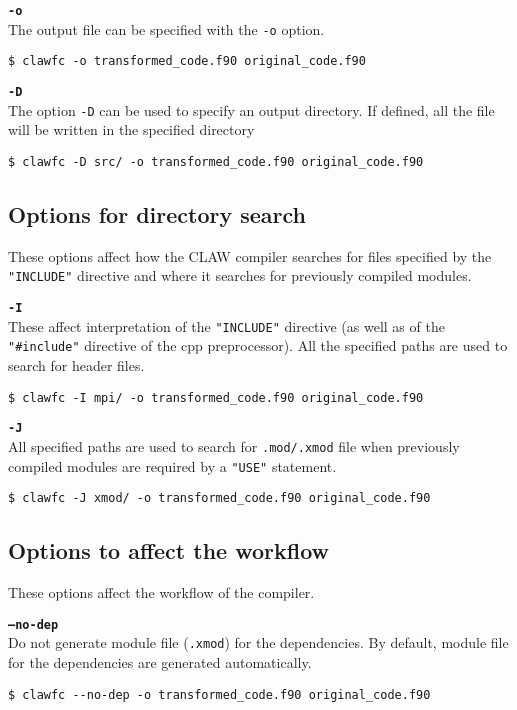 \documentclass{article}
\begin{document}
\textbf{\texttt{-o}}\\
The output file can be specified with the \texttt{-o} option. 
\begin{lstlisting}
$ clawfc -o transformed_code.f90 original_code.f90
\end{lstlisting}

\textbf{\texttt{-D}}\\
The option \texttt{-D} can be used to specify an output directory. If defined, all the file 
will be written in the specified directory

\begin{lstlisting}
$ clawfc -D src/ -o transformed_code.f90 original_code.f90
\end{lstlisting}



\subsection{Options for directory search}
These options affect how the CLAW compiler searches for files specified by the
\texttt{"INCLUDE"} directive and where it searches for previously compiled modules.

\textbf{\texttt{-I}}\\
These affect interpretation of the \texttt{"INCLUDE"} directive (as well as of the \texttt{"\#include"} directive of the cpp preprocessor).
All the specified paths are used to search for header files.
\begin{lstlisting}
$ clawfc -I mpi/ -o transformed_code.f90 original_code.f90
\end{lstlisting}

\textbf{\texttt{-J}}\\
All specified paths are used to search for \texttt{.mod/.xmod} file when previously compiled modules are required by a \texttt{"USE"} statement.
\begin{lstlisting}
$ clawfc -J xmod/ -o transformed_code.f90 original_code.f90
\end{lstlisting}


\subsection{Options to affect the workflow}
These options affect the workflow of the compiler. 

\textbf{\texttt{--no-dep}}\\
Do not generate module file (\texttt{.xmod}) for the dependencies. By default, module file for the dependencies are generated automatically. 
\begin{lstlisting}
$ clawfc --no-dep -o transformed_code.f90 original_code.f90
\end{lstlisting}
\end{document}
